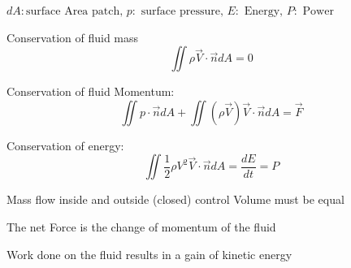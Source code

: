 \documentclass[fontsize=6pt,DIV=calc,a4paper,ngerman]{scrartcl}
\begin{document}
\begin{multicols*}{4}
{		$dA: \text{surface Area patch, } p: \text{ surface pressure, } E: \text{ Energy, } P: \text{ Power}$
	}

	\smallskip
	\begin{minipage}{0.6\linewidth}
		Conservation of fluid mass
		$$\displaystyle \iint \rho\vec{V}\cdot \vec{n}dA = 0 $$

		Conservation of fluid Momentum:
		$$\displaystyle \iint p\cdot \vec{n}dA+\iint (\rho\vec{V})\vec{V}\cdot \vec{n}dA = \vec{F} $$

		Conservation of energy:
		$$\displaystyle \iint\frac{1}{2}\rho V^2\vec{V}\cdot \vec{n}dA=\frac{dE}{dt}=P$$

	\end{minipage}\hfill
	\begin{minipage}{0.38\linewidth}
		Mass flow inside and outside (closed) control Volume must be equal

		\bigskip
		The net Force is the change of momentum of the fluid

		\bigskip
		Work done on the fluid results in a gain of kinetic energy

	\end{minipage}


\end{multicols*}
\end{document}
